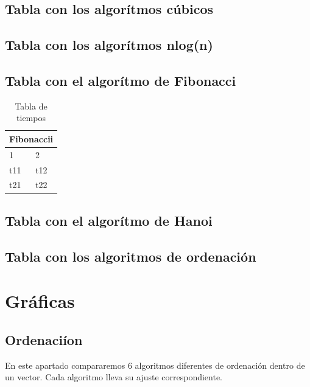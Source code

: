 \documentclass[11pt,spanish]{article} %
\begin{document}
\subsection{Tabla con los algor\'itmos c\'ubicos}
\subsection{Tabla con los algor\'itmos nlog(n)}
\subsection{Tabla con el algor\'itmo de Fibonacci}
\begin{table}[htb]
\centering
\begin{tabular}{|l|l|}
\hline
\multicolumn{2}{|c|}{Fibonaccii} \\ \hline
1 & 2 \\
\hline \hline
t11 & t12 \\ \hline
t21 & t22 \\ \hline
\end{tabular}
\caption{Tabla de tiempos}
\label{tabla:fib}
\end{table}

\subsection{Tabla con el algor\'itmo de Hanoi}
\subsection{Tabla con los algoritmos de ordenaci\'on}

\newpage

\section{Gr\'aficas}

\subsection{Ordenaci\'ion}
En este apartado compararemos 6 algoritmos diferentes de ordenación dentro de un vector.
Cada algoritmo lleva su ajuste correspondiente.
\end{document}
